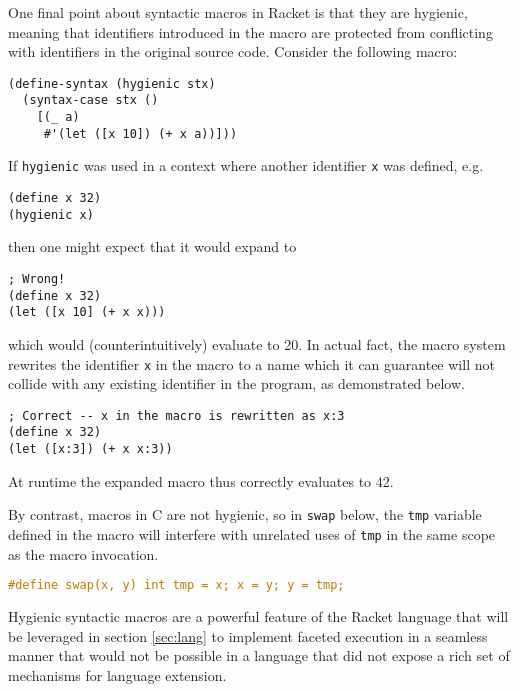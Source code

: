 \documentclass{article}
\begin{document}
One final point about syntactic macros in Racket is that they are hygienic, meaning that identifiers introduced in the macro are protected from conflicting with identifiers in the original source code. Consider the following macro:

\begin{lstlisting}
(define-syntax (hygienic stx)
  (syntax-case stx ()
    [(_ a)
     #'(let ([x 10]) (+ x a))]))
\end{lstlisting}

If \texttt{hygienic} was used in a context where another identifier \texttt{x} was defined, e.g.

\begin{lstlisting}
(define x 32)
(hygienic x)
\end{lstlisting}

then one might expect that it would expand to

\begin{lstlisting}
; Wrong!
(define x 32)
(let ([x 10] (+ x x)))
\end{lstlisting}

which would (counterintuitively) evaluate to 20. In actual fact, the macro system rewrites the identifier \texttt{x} in the macro to a name which it can guarantee will not collide with any existing identifier in the program, as demonstrated below.

\begin{lstlisting}
; Correct -- x in the macro is rewritten as x:3
(define x 32)
(let ([x:3]) (+ x x:3))
\end{lstlisting}

At runtime the expanded macro thus correctly evaluates to 42.

By contrast, macros in C are not hygienic, so in \texttt{swap} below, the \texttt{tmp} variable defined in the macro will interfere with unrelated uses of \texttt{tmp} in the same scope as the macro invocation.

\begin{lstlisting}[language=C]
#define swap(x, y) int tmp = x; x = y; y = tmp;
\end{lstlisting}

Hygienic syntactic macros are a powerful feature of the Racket language that will be leveraged in section \ref{sec:lang} to implement faceted execution in a seamless manner that would not be possible in a language that did not expose a rich set of mechanisms for language extension.
\end{document}
